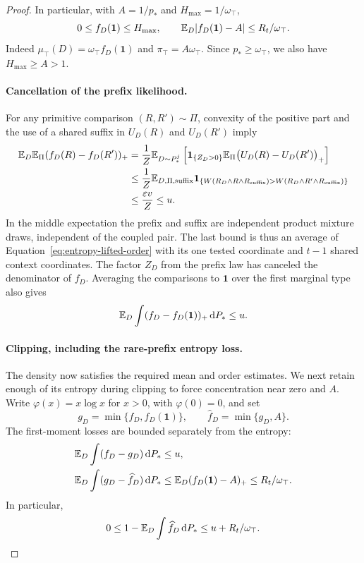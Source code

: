 \begin{proof}
In particular, with $A=1/p_*$ and $H_{\max}=1/\omega_\top$,
\begin{equation}
 \label{eq:entropy-one-control}
 0\le f_D(\mathbf1)\le H_{\max},
 \qquad
 \mathbb E_D\lvert f_D(\mathbf1)-A\rvert\le R_t/\omega_\top.
\end{equation}
Indeed $\mu_\top(D)=\omega_\top f_D(\mathbf1)$ and
$\pi_\top=A\omega_\top$.  Since $p_*\ge\omega_\top$,
we also have $H_{\max}\ge A>1$.

\paragraph{Cancellation of the prefix likelihood.}
For any primitive comparison $(R,R')\sim\Pi$, convexity of the positive
part and the use of a shared suffix in $U_D(R)$ and $U_D(R')$ imply
\begin{align}
 \mathbb E_D\mathbb E_\Pi(f_D(R)-f_D(R'))_+
 &=\frac1Z\mathbb E_{D\sim P_*^j}
       \left[\mathbf 1_{\{Z_D>0\}}
          \mathbb E_\Pi\bigl(U_D(R)-U_D(R')\bigr)_+\right]
 \notag\\
 &\le\frac1Z\mathbb E_{D,\Pi,\mathrm{suffix}}
       \mathbf 1_{\{W(R_D\wedge R\wedge R_{\mathrm{suffix}})
                  >W(R_D\wedge R'\wedge R_{\mathrm{suffix}})\}}
 \notag\\
 &\le\frac{\varepsilon v}{Z}\le u.
 \label{eq:entropy-comparison-density}
\end{align}
In the middle expectation the prefix and suffix are independent product
mixture draws, independent of the coupled pair.  The last bound is thus
an average of Equation~\ref{eq:entropy-lifted-order} with its one tested
coordinate and $t-1$ shared context coordinates.  The factor $Z_D$ from
the prefix law has canceled the denominator of $f_D$.  Averaging the
comparisons to $\mathbf1$ over the first marginal type also gives
\begin{equation}
 \label{eq:entropy-first-clip-mass}
 \mathbb E_D\int(f_D-f_D(\mathbf1))_+\,\mathrm d P_*\le u.
\end{equation}

\paragraph{Clipping, including the rare-prefix entropy loss.}
The density now satisfies the required mean and order estimates. We next
retain enough of its entropy during clipping to force concentration near
zero and $A$.
Write $\varphi(x)=x\log x$ for $x>0$, with $\varphi(0)=0$, and set
\[
 g_D=\min\{f_D,f_D(\mathbf1)\},
 \qquad \widehat f_D=\min\{g_D,A\}.
\]
The first-moment losses are bounded separately from the entropy:
\begin{align}
 \mathbb E_D\int(f_D-g_D)\,\mathrm d P_*&\le u,
 \notag\\
 \mathbb E_D\int(g_D-\widehat f_D)\,\mathrm d P_*
 &\le\mathbb E_D(f_D(\mathbf1)-A)_+\le R_t/\omega_\top.
 \label{eq:entropy-clipping-mass}
\end{align}
In particular,
\begin{equation}
 \label{eq:entropy-clipped-mass}
 0\le1-\mathbb E_D\int\widehat f_D\,\mathrm d P_*
 \le u+R_t/\omega_\top.
\end{equation}


\end{proof}
